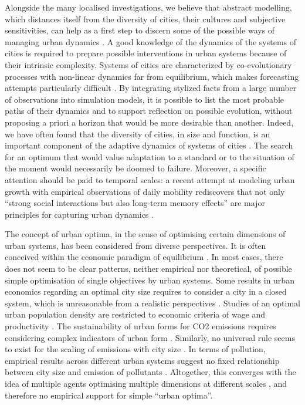 \documentclass[final,5p,times,twocolumn,authoryear]{elsarticle}
\begin{document}
Alongside the many localised investigations, we believe that abstract modelling, which distances itself from the diversity of cities, their cultures and subjective sensitivities, can help as a first step to discern some of the possible ways of managing urban dynamics \citep{pumain2017urban}. A good knowledge of the dynamics of the systems of cities is required to prepare possible interventions in urban systems because of their intrinsic complexity\citep{reggiani2021reflections}. Systems of cities are characterized by co-evolutionary processes with non-linear dynamics far from equilibrium, which makes forecasting attempts particularly difficult \citep{raimbault2020unveiling}. By integrating stylized facts from a large number of observations into simulation models, it is possible to list the most probable paths of their dynamics and to support reflection on possible evolution, without proposing a priori a horizon that would be more desirable than another. Indeed, we have often found that the diversity of cities, in size and function, is an important component of the adaptive dynamics of systems of cities \citep{pumain2021co}. The search for an optimum that would value adaptation to a standard or to the situation of the moment would necessarily be doomed to failure. Moreover, a specific attention should be paid to temporal scales: a recent attempt at modeling urban growth with empirical observations of daily mobility rediscovers that not only ``strong social interactions but also long-term memory effects'' are major principles for capturing urban dynamics \citep{xu2021emergence}.

The concept of urban optima, in the sense of optimising certain dimensions of urban systems, has been considered from diverse perspectives. It is often conceived within the economic paradigm of equilibrium \citep{glaeser2008cities}. In most cases, there does not seem to be clear patterns, neither empirical nor theoretical, of possible simple optimisation of single objectives by urban systems. Some results in urban economics regarding an optimal city size requires to consider a city in a closed system, which is unreasonable from a realistic perspectives \citep{singell1974optimum}. Studies of an optimal urban population density are restricted to economic criteria of wage and productivity \citep{su2017density}. The sustainability of urban forms for CO2 emissions requires considering complex indicators of urban form \citep{le2012urban}. Similarly, no universal rule seems to exist for the scaling of emissions with city size \citep{gudipudi2019urban}. In terms of pollution, empirical results across different urban systems suggest no fixed relationship between city size and emission of pollutants \citep{han2016optimum}. Altogether, this converges with the idea of multiple agents optimising multiple dimensions at different scales \citep{pumain2008socio}, and therefore no empirical support for simple ``urban optima''.
\end{document}
